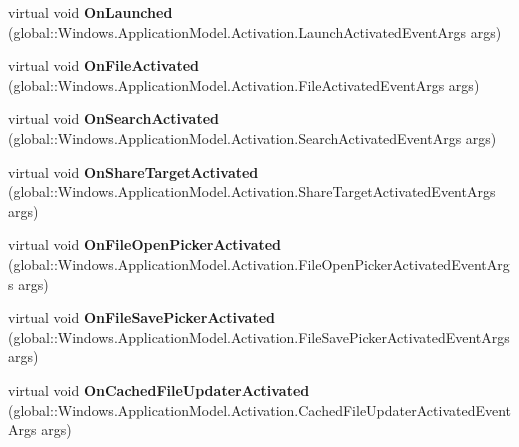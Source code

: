 \begin{DoxyCompactItemize}
\item 
\mbox{\label{class_windows_1_1_u_i_1_1_xaml_1_1_application_ac34abc539f620025d7e6026118ec1fb9}} 
virtual void {\bfseries On\+Launched} (global\+::\+Windows.\+Application\+Model.\+Activation.\+Launch\+Activated\+Event\+Args args)
\item 
\mbox{\label{class_windows_1_1_u_i_1_1_xaml_1_1_application_ad3a115248881604e559640ff7d3f1510}} 
virtual void {\bfseries On\+File\+Activated} (global\+::\+Windows.\+Application\+Model.\+Activation.\+File\+Activated\+Event\+Args args)
\item 
\mbox{\label{class_windows_1_1_u_i_1_1_xaml_1_1_application_a361d968000b09b19ff4e794b6550ff86}} 
virtual void {\bfseries On\+Search\+Activated} (global\+::\+Windows.\+Application\+Model.\+Activation.\+Search\+Activated\+Event\+Args args)
\item 
\mbox{\label{class_windows_1_1_u_i_1_1_xaml_1_1_application_a9281a10e995bfc3ce84c4732cd139856}} 
virtual void {\bfseries On\+Share\+Target\+Activated} (global\+::\+Windows.\+Application\+Model.\+Activation.\+Share\+Target\+Activated\+Event\+Args args)
\item 
\mbox{\label{class_windows_1_1_u_i_1_1_xaml_1_1_application_a6349d39f9b31d3d870acad8ce929f8cb}} 
virtual void {\bfseries On\+File\+Open\+Picker\+Activated} (global\+::\+Windows.\+Application\+Model.\+Activation.\+File\+Open\+Picker\+Activated\+Event\+Args args)
\item 
\mbox{\label{class_windows_1_1_u_i_1_1_xaml_1_1_application_ac08cc52e93ef57a27360f3cb1ae256c4}} 
virtual void {\bfseries On\+File\+Save\+Picker\+Activated} (global\+::\+Windows.\+Application\+Model.\+Activation.\+File\+Save\+Picker\+Activated\+Event\+Args args)
\item 
\mbox{\label{class_windows_1_1_u_i_1_1_xaml_1_1_application_a7f572e2107540b33cb772a84ddd7ec72}} 
virtual void {\bfseries On\+Cached\+File\+Updater\+Activated} (global\+::\+Windows.\+Application\+Model.\+Activation.\+Cached\+File\+Updater\+Activated\+Event\+Args args)

\end{DoxyCompactItemize}
